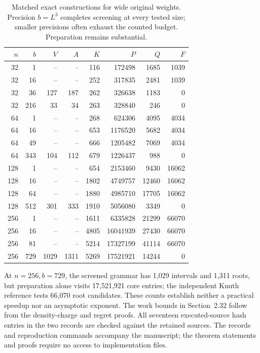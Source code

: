 \documentclass[11pt]{article}
\begin{document}
\begin{table}[htbp]
\centering\small
\begin{tabular}{rrrrrrrr}
\toprule
$n$ & $b$ & $V$ & $A$ & $K$ & $P$ & $Q$ & $F$\\
\midrule
32 & 1 & -- & -- & 116 & 172498 & 1685 & 1039\\
32 & 16 & -- & -- & 252 & 317835 & 2481 & 1039\\
32 & 36 & 127 & 187 & 262 & 326638 & 1183 & 0\\
32 & 216 & 33 & 34 & 263 & 328840 & 246 & 0\\
64 & 1 & -- & -- & 268 & 624306 & 4095 & 4034\\
64 & 16 & -- & -- & 653 & 1176520 & 5682 & 4034\\
64 & 49 & -- & -- & 666 & 1205482 & 7069 & 4034\\
64 & 343 & 104 & 112 & 679 & 1226437 & 988 & 0\\
128 & 1 & -- & -- & 654 & 2153460 & 9430 & 16062\\
128 & 16 & -- & -- & 1802 & 4749757 & 12460 & 16062\\
128 & 64 & -- & -- & 1880 & 4985710 & 17705 & 16062\\
128 & 512 & 301 & 333 & 1910 & 5056080 & 3349 & 0\\
256 & 1 & -- & -- & 1611 & 6335828 & 21299 & 66070\\
256 & 16 & -- & -- & 4805 & 16041939 & 27430 & 66070\\
256 & 81 & -- & -- & 5214 & 17327199 & 41114 & 66070\\
256 & 729 & 1029 & 1311 & 5269 & 17521921 & 14244 & 0\\
\bottomrule
\end{tabular}
\caption{Matched exact constructions for wide original weights. Precision
$b=L^3$ completes screening at every tested size; smaller precisions often
exhaust the counted budget. Preparation remains substantial.}
\label{tab:coarse-screen-wide}
\end{table}

At $n=256,b=729$, the screened grammar has 1,029 intervals and 1,311 roots,
but preparation alone visits 17,521,921 core entries; the independent
Knuth reference tests 66,070 root candidates. These counts establish
neither a practical speedup nor an asymptotic exponent. The work bounds
in Section~2.32 follow from the density-charge and
regret proofs. All seventeen executed-source hash entries in the two
records are checked against the retained sources. The records and
reproduction commands accompany the manuscript; the theorem statements
and proofs require no access to implementation files.
\end{document}

